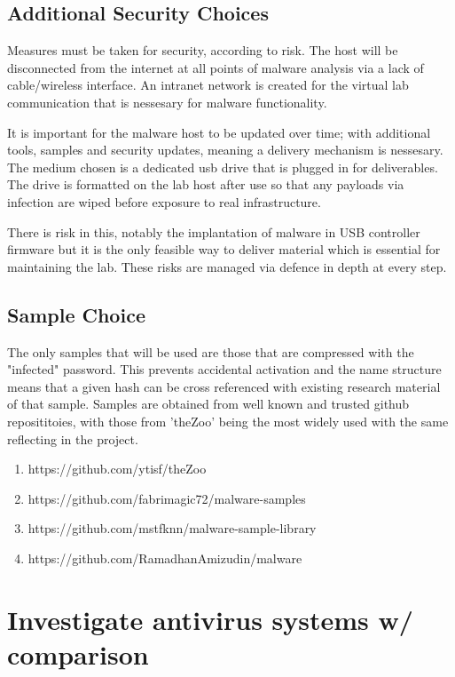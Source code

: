 
\section{Additional Security Choices}
Measures must be taken for security, according to risk. The host will be disconnected from the internet at all points of malware analysis via a lack of cable/wireless interface. An intranet network is created for the virtual lab communication that is nessesary for malware functionality.

It is important for the malware host to be updated over time; with additional tools, samples and security updates, meaning a delivery mechanism is nessesary. The medium chosen is a dedicated usb drive that is plugged in for deliverables. The drive is formatted on the lab host after use so that 
any payloads via infection are wiped before exposure to real infrastructure. 

There is risk in this, notably the implantation of malware in USB controller firmware but it is the only feasible way to deliver material which is essential for maintaining the lab. These risks are managed via defence in depth at every step.


\section{Sample Choice}
The only samples that will be used are those that are compressed with the "infected" password. This prevents accidental activation and the name structure means that a given hash can be cross referenced with existing research material of that sample. 
Samples are obtained from well known and trusted github reposititoies, with those from 'theZoo' being the most widely used with the same reflecting in the project.

\begin{enumerate}
    \item https://github.com/ytisf/theZoo
    \item https://github.com/fabrimagic72/malware-samples
    \item https://github.com/mstfknn/malware-sample-library
    \item https://github.com/RamadhanAmizudin/malware
\end{enumerate}

\chapter{Investigate antivirus systems w/ comparison}


